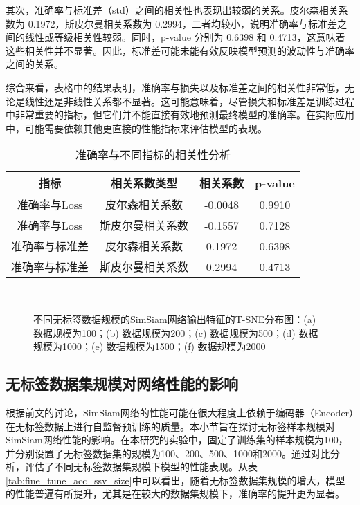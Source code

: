 \documentclass[master]{thesis-uestc}
\begin{document}
其次，准确率与标准差（std）之间的相关性也表现出较弱的关系。皮尔森相关系数为 0.1972，斯皮尔曼相关系数为 0.2994，二者均较小，说明准确率与标准差之间的线性或等级相关性较弱。同时，p-value 分别为 0.6398 和 0.4713，这意味着这些相关性并不显著。因此，标准差可能未能有效反映模型预测的波动性与准确率之间的关系。

综合来看，表格中的结果表明，准确率与损失以及标准差之间的相关性非常低，无论是线性还是非线性关系都不显著。这可能意味着，尽管损失和标准差是训练过程中非常重要的指标，但它们并不能直接有效地预测最终模型的准确率。在实际应用中，可能需要依赖其他更直接的性能指标来评估模型的表现。

\begin{table}
    \centering
    \caption{准确率与不同指标的相关性分析}
    \begin{tabular}{cccc}
    \toprule
    \textbf{指标} & \textbf{相关系数类型} & \textbf{相关系数} & \textbf{p-value} \\
    \midrule
    准确率与Loss     & 皮尔森相关系数   & -0.0048 & 0.9910 \\
    准确率与Loss     & 斯皮尔曼相关系数 & -0.1557 & 0.7128 \\
    准确率与标准差      & 皮尔森相关系数   & 0.1972 & 0.6398 \\
    准确率与标准差      & 斯皮尔曼相关系数 & 0.2994 & 0.4713 \\
    \bottomrule
    \end{tabular}
    \label{tab:correlation_with_acc}
    \end{table}

\begin{figure}[h]
    \centering
    \\
    
    \caption{不同无标签数据规模的SimSiam网络输出特征的T-SNE分布图：(a) 数据规模为100；(b) 数据规模为200；(c) 数据规模为500；(d) 数据规模为1000；(e) 数据规模为1500；(f) 数据规模为2000}
    \label{tsne_diff_ssv_size}
\end{figure}
\subsection{无标签数据集规模对网络性能的影响}
根据前文的讨论，SimSiam网络的性能可能在很大程度上依赖于编码器（Encoder）在无标签数据上进行自监督预训练的质量。本小节旨在探讨无标签样本规模对SimSiam网络性能的影响。在本研究的实验中，固定了训练集的样本规模为100，并分别设置了无标签数据集的规模为100、200、500、1000和2000。通过对比分析，评估了不同无标签数据集规模下模型的性能表现。从表\ref{tab:fine_tune_acc_ssv_size}中可以看出，随着无标签数据集规模的增大，模型的性能普遍有所提升，尤其是在较大的数据集规模下，准确率的提升更为显著。
\end{document}
